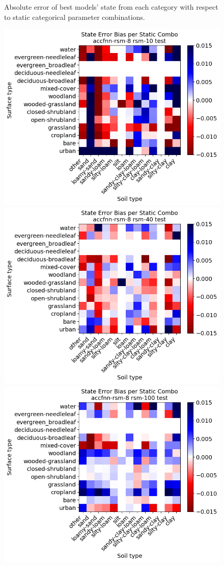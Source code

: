 \begin{figure}[hp!]
    \caption{Absolute error of best models' state from each category with respect to static categorical parameter combinations.}
    \label{best-static-abserr}
\end{figure}

\begin{figure}[hp!]
    \centering

    \includegraphics[width=.32\linewidth,draft=false]{figures/static-combos/eval_test_accfnn-rsm-8_rsm-10_static-combos_bias_state.png}
    \includegraphics[width=.32\linewidth,draft=false]{figures/static-combos/eval_test_accfnn-rsm-8_rsm-40_static-combos_bias_state.png}
    \includegraphics[width=.32\linewidth,draft=false]{figures/static-combos/eval_test_accfnn-rsm-8_rsm-100_static-combos_bias_state.png}


\end{figure}
